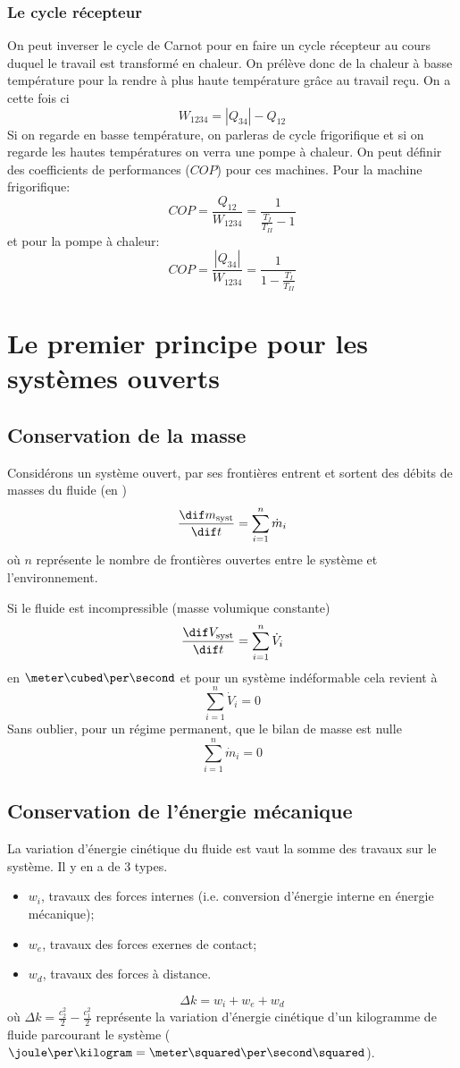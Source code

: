 \subsubsection{Le cycle récepteur}
On peut inverser le cycle de Carnot pour en faire
un cycle récepteur au cours duquel le travail est transformé en chaleur.
On prélève donc de la chaleur à basse température pour
la rendre à plus haute température grâce au travail reçu.
On a cette fois ci
\[ W_{1234} = |Q_{34}|-Q_{12} \]
Si on regarde en basse température, on parleras de cycle frigorifique et
si on regarde les hautes températures on verra une pompe à chaleur.
On peut définir des coefficients de performances ($COP$) pour ces machines.
Pour la machine frigorifique:
\[  COP = \frac {Q_{12}}{W_{1234}} = \frac{1}{\frac{T_I}{T_{II}} -1} \]
et pour la pompe à chaleur:
\[  COP = \frac{|Q_{34}|}{W_{1234}} = \frac {1} {1-\frac{T_I}{T_{II}}} \]

\section{Le premier principe pour les systèmes ouverts}
\subsection{Conservation de la masse}
Considérons un système ouvert, par ses frontières entrent et
sortent des débits de masses du fluide (en \kilogram\per\second)
\[ \frac{\dif m_\mathrm{syst}}{\dif t} = \sum_{i = 1}^{n} \dot m_i \]
où $n$ représente le nombre de frontières ouvertes entre
le système et l'environnement.

Si le fluide est incompressible (masse volumique constante)
\[ \frac{\dif V_\mathrm{syst}}{\dif t} = \sum_{i = 1}^{n}\dot V_i \]
en $\meter\cubed\per\second$ et pour un système indéformable cela revient à
\[  \sum_{i = 1}^n \dot V_i = 0 \]
Sans oublier, pour un régime permanent, que le bilan de masse est nulle
\[ \sum_{i = 1}^n \dot m_i = 0 \]

\subsection{Conservation de l'énergie mécanique}
La variation d'énergie cinétique du fluide est vaut
la somme des travaux sur le système.
Il y en a de 3 types.
\begin{itemize}
  \item $w_i$, travaux des forces internes
    (i.e. conversion d'énergie interne en énergie mécanique);
  \item $w_e$, travaux des forces exernes de contact;
  \item $w_d$, travaux des forces à distance.
\end{itemize}
\[ \Delta k = w_i + w_e + w_d \]
où $\Delta k = \frac{c_2^2}{2}-\frac{c_1^2}{2}$ représente la variation
d'énergie cinétique d'un kilogramme de fluide parcourant
le système ($\joule\per\kilogram = \meter\squared\per\second\squared$).


